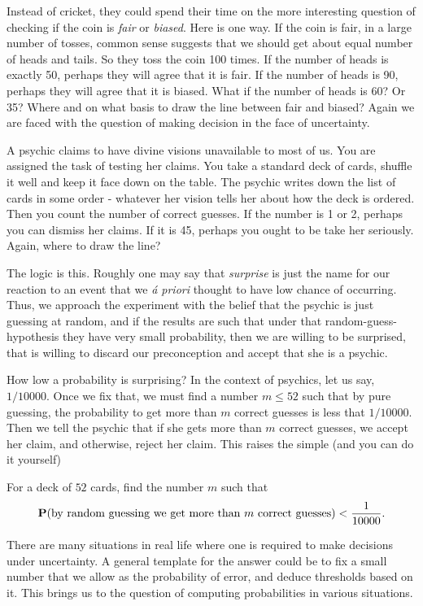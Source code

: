\documentclass[preprint,  11pt]{amsart}
\begin{document}
Instead of cricket, they could spend their time on the more interesting question of checking if the coin is {\em fair} or {\em biased}. Here is one way. If the coin is fair, in a large number of tosses, common sense suggests that we should get about equal number of heads and tails. So they  toss the coin 100 times. If the number of heads is exactly 50, perhaps they will agree that it is fair. If the number of heads is 90, perhaps they will agree that it is biased. What if the number of heads is 60? Or 35? Where and on what basis to draw the line between fair and biased? Again we are faced with the question of making decision in the face of uncertainty.
\eeg

\beg A psychic claims to have divine visions unavailable to most of us. You are assigned the task of testing her claims. You take a standard deck of cards, shuffle it well and keep it face down on the table. The psychic writes down the list of cards in some order - whatever her vision tells her about how the deck is ordered. Then you count the number of correct guesses. If the number is 1 or 2, perhaps you can dismiss her claims. If it is 45, perhaps you ought to be take her seriously. Again, where to draw the line? 

The logic is this. Roughly one may say that {\em surprise} is just the name for our reaction to an event that we {\em \'{a} priori} thought to have low chance of occurring. Thus, we approach the experiment with the belief that the psychic is just guessing at random, and if the results are such that under that random-guess-hypothesis they have very small probability, then we are willing to be surprised, that is willing to discard our preconception and accept that she is a psychic. 

How low a probability is surprising? In the context of psychics, let us say, $1/10000$. Once we fix that, we must find a number $m\le 52$ such that by pure guessing, the probability to get more than $m$ correct guesses is less that $1/10000$. Then we tell the psychic that if she gets more than $m$ correct guesses, we accept her claim, and otherwise, reject her claim.  This raises the simple (and you can do it yourself) 
\begin{question} For a deck of $52$ cards, find the number $m$ such that
$$
\mathbf{P}(\mbox{by random guessing we get more than }m\mbox{ correct guesses})<\frac{1}{10000}.
$$
\end{question}
\eeg


 There are many situations in real life where one is required to make decisions under uncertainty. A general template for the answer could be to fix a small number that we allow as the probability of error, and deduce thresholds based on it. This brings us to the question of computing probabilities in various situations.
\end{document}

